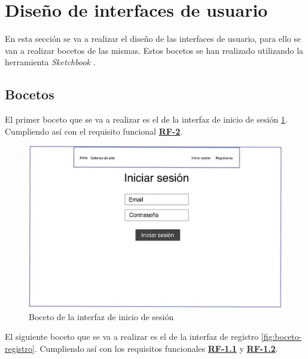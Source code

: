 \newpage

\section{Diseño de interfaces de usuario}
En esta sección se va a realizar el diseño de las interfaces de usuario, para
ello se van a realizar bocetos de las mismas. Estos bocetos se han realizado
utilizando la herramienta \textit{Sketchbook} \cite{sketchbook}.

\subsection{Bocetos}
El primer boceto que se va a realizar es el de la interfaz de inicio de sesión
\ref{fig:boceto-iniciar-sesion}. Cumpliendo así con el requisito funcional
\hyperref[tab:rf-2]{\textbf{RF-2}}.

\begin{figure}[H]
  \centering
  \includegraphics[width=\textwidth]{img/iniciar-sesion}
  \caption{Boceto de la interfaz de inicio de sesión}
  \label{fig:boceto-iniciar-sesion}
\end{figure}

El siguiente boceto que se va a realizar es el de la interfaz de registro
\ref{fig:boceto-registro}. Cumpliendo así con los requisitos funcionales
\hyperref[tab:rf-1-1]{\textbf{RF-1.1}} y \hyperref[tab:rf-1-2]{\textbf{RF-1.2}}.

